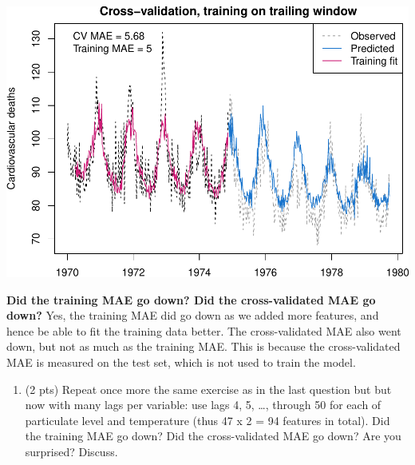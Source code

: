 \documentclass[
]{article}
\providecommand{\tightlist}{%
  \setlength{\itemsep}{0pt}\setlength{\parskip}{0pt}}
\begin{document}
\includegraphics{homework2_files/figure-latex/unnamed-chunk-3-1.pdf}

\textbf{Did the training MAE go down? Did the cross-validated MAE go
down?} Yes, the training MAE did go down as we added more features, and
hence be able to fit the training data better. The cross-validated MAE
also went down, but not as much as the training MAE. This is because the
cross-validated MAE is measured on the test set, which is not used to
train the model.

\begin{enumerate}
\def\labelenumi{\arabic{enumi}.}
\setcounter{enumi}{13}
\tightlist
\item
  (2 pts) Repeat once more the same exercise as in the last question but
  but now with many lags per variable: use lags 4, 5, \ldots, through 50
  for each of particulate level and temperature (thus 47 x 2 = 94
  features in total). Did the training MAE go down? Did the
  cross-validated MAE go down? Are you surprised? Discuss.
\end{enumerate}
\end{document}
